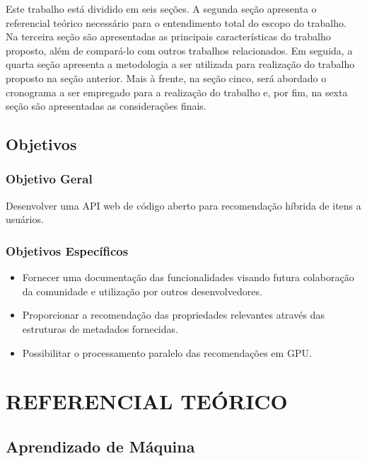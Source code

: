 \documentclass[12pt, openright, oneside, a4paper, brazil]{abntex2}
\begin{document}
Este trabalho está dividido em seis seções. A segunda seção apresenta o referencial teórico necessário para o entendimento total do escopo do trabalho. Na terceira seção são apresentadas as principais características do trabalho proposto, além de compará-lo com outros trabalhos relacionados. Em seguida, a quarta seção apresenta a metodologia a ser utilizada para realização do trabalho proposto na seção anterior. Mais à frente, na seção cinco, será abordado o cronograma a ser empregado para a realização do trabalho e, por fim, na sexta seção são apresentadas as considerações finais.

\section{Objetivos}

\subsection{Objetivo Geral}

Desenvolver uma API web de código aberto para recomendação híbrida de itens a usuários.

\subsection{Objetivos Específicos}

\begin{itemize}

	\item Fornecer uma documentação das funcionalidades visando futura colaboração da comunidade e utilização por outros desenvolvedores.
	\item Proporcionar a recomendação das propriedades relevantes através das estruturas de metadados fornecidas.
	\item Possibilitar o processamento paralelo das recomendações em GPU.

\end{itemize}

%
%
\cleardoublepage

\chapter{REFERENCIAL TEÓRICO}

\section{Aprendizado de Máquina}
\end{document}
